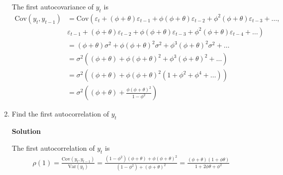 \documentclass[12pt]{article}
\begin{document}
\begin{enumerate}
          The first autocovariance of $ y_{t} $ is
          \begin{align*}
              \mathrm{Cov} (y_{t}, y_{t-1}) & = \mathrm{Cov} \left( \varepsilon_{t} + \left( \phi + \theta \right) \varepsilon_{t-1} + \phi \left( \phi + \theta \right) \varepsilon_{t-2} + \phi^2 \left( \phi + \theta \right) \varepsilon_{t-3} + \ldots, \right. \\
                                            & \left. \varepsilon_{t-1} + \left( \phi + \theta \right) \varepsilon_{t-2} + \phi \left( \phi + \theta \right) \varepsilon_{t-3} + \phi^2 \left( \phi + \theta \right) \varepsilon_{t-4} + \ldots \right)               \\
                                            & = \left( \phi + \theta \right) \sigma^2 + \phi \left( \phi + \theta \right)^2 \sigma^2 + \phi^3 \left( \phi + \theta \right)^2 \sigma^2 + \ldots                                                                       \\
                                            & = \sigma^2 \left( \left( \phi + \theta \right) + \phi \left( \phi + \theta \right)^2 + \phi^3 \left( \phi + \theta \right)^2 + \ldots \right)                                                                          \\
                                            & = \sigma^2 \left( \left( \phi + \theta \right) + \phi \left( \phi + \theta \right)^2 \left( 1 + \phi^2 + \phi^4 + \ldots \right) \right)                                                                               \\
                                            & = \sigma^2 \left( \left( \phi + \theta \right) + \frac{\phi \left( \phi + \theta \right)^2}{1 - \phi^2} \right)
          \end{align*}

    \item Find the first autocorrelation of $ y_{t} $

          \textbf{Solution}

          The first autocorrelation of $ y_{t} $ is
          \begin{align*}
              \rho(1) = \frac{\mathrm{Cov} (y_{t}, y_{t-1})}{\mathrm{Var} (y_{t})} = \frac{\left( 1-\phi^2 \right)\left( \phi + \theta \right) + \phi \left( \phi + \theta \right)^2}{\left( 1-\phi^2 \right) + \left( \phi+\theta \right)^2} = \frac{\left(\phi + \theta\right)\left( 1 + \phi \theta \right)}{1 + 2 \phi \theta + \phi^2}
          \end{align*}

\end{enumerate}

\end{document}

